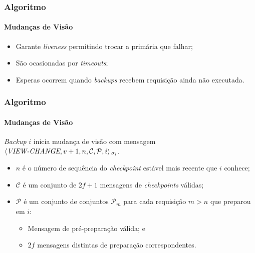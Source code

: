 \documentclass{beamer}
\begin{document}
\begin{frame}
  \frametitle{Algoritmo}
  \framesubtitle{Mudanças de Visão}

  \begin{itemize}
    \item
      Garante \textit{liveness} permitindo trocar a primária que falhar;

      \pause
    \item
      São ocasionadas por \textit{timeouts};

      \pause
    \item
      Esperas ocorrem quando \textit{backups} recebem requisição ainda não executada.
  \end{itemize}
\end{frame}

\begin{frame}
  \frametitle{Algoritmo}
  \framesubtitle{Mudanças de Visão}

  \textit{Backup} $i$ inicia mudança de visão com mensagem $\braket{\textit{VIEW-CHANGE}, v + 1, n, \mathcal{C}, \mathcal{P}, i}{}_{\sigma_i}$.
  \begin{itemize}
      \pause
    \item
      $n$ é o número de sequência do \textit{checkpoint} estável mais recente que $i$ conhece;

      \pause
    \item
      $\mathcal{C}$ é um conjunto de $2f + 1$ mensagens de \textit{checkpoints} válidas;

      \pause
    \item
      $\mathcal{P}$ é um conjunto de conjuntos $\mathcal{P}_m$ para cada requisição $m > n$ que preparou em $i$:
      \begin{itemize}
        \item
          Mensagem de pré-preparação válida; e
        
        \item
          $2f$ mensagens distintas de preparação correspondentes.
      \end{itemize}
  \end{itemize}
\end{frame}
\end{document}
